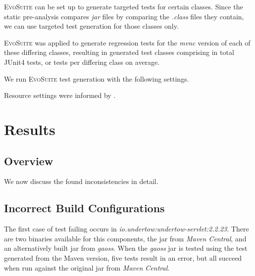 \documentclass[conference]{IEEEtran}
\makeatletter
\newcommand{\evosuite}{\textsc{EvoSuite}\@\xspace}
\newcommand{\inputgen}[1]{\unskip}
\makeatother
\begin{document}
\evosuite can be set up to generate targeted tests for certain classes. Since the static pre-analysis compares \textit{jar} files by comparing the \textit{.class} files they contain, we can use targeted test generation for those classes only.   


\evosuite was applied to generate regression tests for the \textit{mvnc} version of each of these \inputgen{num-class-pairs-after-invokevirtual-invokeinterface} differing classes, resulting in \inputgen{num-classes-with-generated-tests} generated test classes comprising in total \inputgen{num-generated-tests} JUnit4 tests, or \inputgen{avg-tests-per-class} tests per differing class on average.

We run \evosuite test generation with the following settings. 



Resource settings were informed by \cite{jahangirova2023sbft}. 



\section{Results}

\subsection{Overview}


We now discuss the found inconsistencies in detail.

\subsection{Incorrect Build Configurations}


The first case of test failing occurs in \textit{io.undertow:undertow-servlet:2.2.23}. There are two binaries available for this components, the jar from \textit{Maven Central}, and an alternatively built jar from \textit{gaoss}. When the  \textit{gaoss} jar is tested using the test generated from the Maven version, five tests result in an error, but all succeed when run against the original jar from \textit{Maven Central}.
\end{document}

